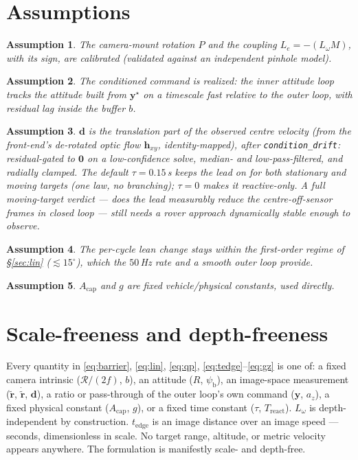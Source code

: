 \documentclass[11pt]{article}
\newtheorem{assumption}{Assumption}
\begin{document}
\section{Assumptions}
\begin{assumption} The camera-mount rotation $P$ and the coupling $L_e=-(L_\omega M)$, with its sign, are
calibrated (validated against an independent pinhole model). \end{assumption}
\begin{assumption} The conditioned command is realized: the inner attitude loop tracks the attitude built
from $\boldsymbol{y}^\star$ on a timescale fast relative to the outer loop, with residual lag inside the
buffer $b$. \end{assumption}
\begin{assumption} $\boldsymbol{d}$ is the translation part of the observed centre velocity (from the
front-end's de-rotated optic flow $\boldsymbol{h}_{xy}$, identity-mapped), \emph{after}
\texttt{condition\_drift}: residual-gated to $\boldsymbol{0}$ on a low-confidence solve, median- and
low-pass-filtered, and radially clamped. The default $\tau=0.15$\,s keeps the lead on for both
stationary and moving targets (one law, no branching); $\tau=0$ makes it reactive-only. A full
moving-target verdict --- does the lead measurably reduce the centre-off-sensor frames in closed loop
--- still needs a rover approach dynamically stable enough to observe. \end{assumption}
\begin{assumption} The per-cycle lean change stays within the first-order regime of \S\ref{sec:lin}
($\lesssim15^\circ$), which the $50$\,Hz rate and a smooth outer loop provide. \end{assumption}
\begin{assumption} $A_\text{cap}$ and $g$ are fixed vehicle/physical constants, used directly. \end{assumption}

\section{Scale-freeness and depth-freeness}
Every quantity in \eqref{eq:barrier}, \eqref{eq:lin}, \eqref{eq:qp}, \eqref{eq:tedge}--\eqref{eq:gz} is
one of: a fixed camera intrinsic ($\mathcal{R}/(2f)$, $b$), an attitude ($R$, $\psi_\text{b}$), an
image-space measurement ($\tilde{\boldsymbol{r}}$, $\dot{\tilde{\boldsymbol{r}}}$, $\boldsymbol{d}$), a
ratio or pass-through of the outer loop's own command ($\boldsymbol{y}$, $a_z$), a fixed physical
constant ($A_\text{cap}$, $g$), or a fixed time constant ($\tau$, $T_\text{react}$). $L_\omega$ is
depth-independent by construction. $t_\text{edge}$ is an image distance over an image speed --- seconds,
dimensionless in scale. No target range, altitude, or metric velocity appears anywhere. The formulation
is manifestly scale- and depth-free.
\end{document}
